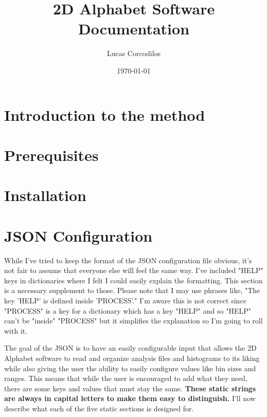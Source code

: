 \documentclass[letter]{article}
\title{2D Alphabet Software Documentation}
\author{Lucas Corcodilos}
\date{\today}
\begin{document}
\maketitle
\titlespacing{\section}{0pt}{5pt}{0pt}
\titlespacing{\subsection}{0pt}{5pt}{0pt}
\setlength{\parskip}{1em}

\section{Introduction to the method}

\section{Prerequisites}

\section{Installation}

\section{JSON Configuration}
While I've tried to keep the format of the JSON configuration file obvious, it's not fair to assume that everyone else will feel the same way. I've included "HELP" keys in dictionaries where I felt I could easily explain the formatting. This section is a necessary supplement to those. Please note that I may use phrases like, "The key 'HELP' is defined inside 'PROCESS'." I'm aware this is not correct since "PROCESS" is a key for a dictionary which has a key "HELP" and so "HELP" can't be "inside" "PROCESS" but it simplifies the explanation so I'm going to roll with it.  

The goal of the JSON is to have an easily configurable input that allows the 2D Alphabet software to read and organize analysis files and histograms to its liking while also giving the user the ability to easily configure values like bin sizes and ranges. This means that while the user is encouraged to add what they need, there are some keys and values that must stay the same. \textbf{These static strings are always in capital letters to make them easy to distinguish.} I'll now describe what each of the five static sections is designed for.
\end{document}

